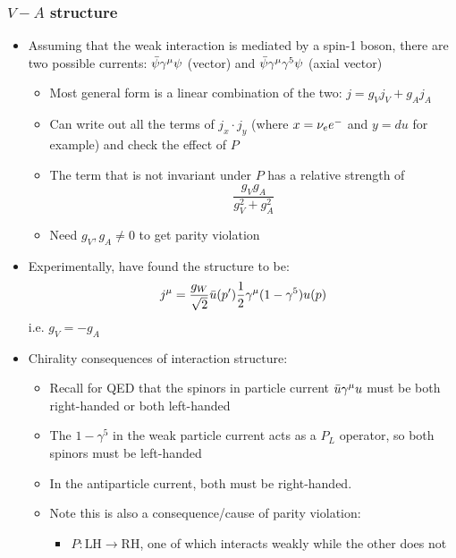 \subsubsection{$V-A$ structure}
\begin{itemize}
  \item Assuming that the weak interaction is mediated by a spin-1 boson, there are two possible currents: $\bar{\psi} \gamma^\mu \psi$ (vector) and $\bar{\psi} \gamma^\mu \gamma^5 \psi$ (axial vector)
  \begin{itemize}
    \item Most general form is a linear combination of the two: $j = g_V j_V + g_A j_A$
    \item Can write out all the terms of $j_x\cdot j_y$ (where $x=\nu_e e^{-}$ and $y=du$ for example) and check the effect of $P$
    \item The term that is not invariant under $P$ has a relative strength of 
    \begin{equation}
      \frac{g_Vg_A}{g_V^2+g_A^2}
    \end{equation}
    \item \thus Need $g_V,g_A\neq 0$ to get parity violation
  \end{itemize}
  \item Experimentally, have found the structure to be:
  \begin{equation}
    j^\mu = \frac{g_W}{\sqrt{2}} \bar{u}(p')\frac{1}{2}\gamma^\mu (1-\gamma^5)u(p)
  \end{equation}
  i.e. $g_V = - g_A$
  \item Chirality consequences of interaction structure:
  \begin{itemize}
    \item Recall for QED that the spinors in particle current $\bar{u} \gamma^\mu u$ must be both right-handed or both left-handed
    \item The $1-\gamma^5$ in the weak particle current acts as a $P_L$ operator, so both spinors must be left-handed
    \item In the antiparticle current, both must be right-handed.
    \item Note this is also a consequence/cause of parity violation:
    \begin{itemize}
      \item $P:\text{LH} \rightarrow \text{RH}$, one of which interacts weakly while the other does not
    \end{itemize}
  \end{itemize}
\end{itemize}

